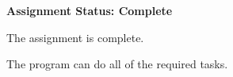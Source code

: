 \documentclass[11pt]{memo}
\begin{document}
\USM

\Date{\today}

\begin{memo}

\textbf{Assignment Status: Complete}

The assignment is complete.

The program can do all of the required tasks.  

\end{memo}
\end{document}
